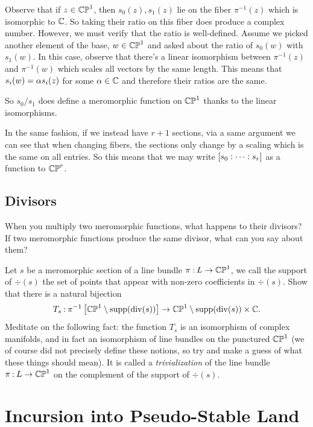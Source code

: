 \documentclass[12pt]{memoir}
\begin{document}
\begin{ptcbr}
    Observe that if $z\in\mathbb{CP}^1$, then $s_0(z),s_1(z)$ lie on the fiber $\pi^{-1}(z)$ which is isomorphic to $\mathbb{C}$. So taking their ratio on this fiber does produce a complex number. However, we must verify that the ratio is well-defined. Assume we picked another element of the base, $w\in\mathbb{CP}^1$ and asked about the ratio of $s_0(w)$ with $s_1(w)$. In this case, observe that there's a linear isomorphism between $\pi^{-1}(z)$ and $\pi^{-1}(w)$ which scales all vectors by the same length. This means that $s_i(w)=\alpha s_i(z)$ for some $\alpha\in\mathbb{C}$ and therefore their ratios are the same.\par
    So $s_0/s_1$ does define a meromorphic function on $\mathbb{CP}^1$ thanks to the linear isomorphisms.\par
    In the same fashion, if we instead have $r+1$ sections, via a same argument we can see that when changing fibers, the sections only change by a scaling which is the same on all entries. So this means that we may write $\left\lbrack s_0:\dots:s_r\right\rbrack$ as a function to $\mathbb{CP}^r$.
\end{ptcbr}

\section{Divisors}

\begin{Ej}
    When you multiply two meromorphic functions, what happens to their divisors? If two meromorphic functions produce the same divisor, what can you say about them?
\end{Ej}

\begin{Ej}
    Let $s$ be a meromorphic section of a line bundle $\pi\mathbin{:} L\to\mathbb{CP}^1$, we call the support of $\div(s)$ the set of points that appear with non-zero coefficients in $\div(s)$. Show that there is a natural bijection 
    $$T_s\mathbin{:}\pi^{-1}\left\lbrack\mathbb{CP}^1\setminus\operatorname{supp}(\operatorname{div}(s))\right\rbrack\to\mathbb{CP}^1\setminus\operatorname{supp}(\operatorname{div}(s))\times\mathbb{C}.$$
Meditate on the following fact: the function $T_s$ 
 is an isomorphism of complex manifolds, and in fact an isomorphism of line bundles on the punctured $\mathbb{CP}^1$
 (we of course did not precisely define these notions, so try and make a guess of what these things should mean). It is called a \emph{trivialization}  of the line bundle $\pi\mathbin{:} L\to\mathbb{CP}^1$
 on the complement of the support of $\div(s)$.
\end{Ej}

\chapter{Incursion into Pseudo-Stable Land}
\end{document}
